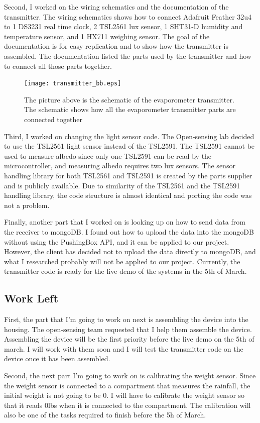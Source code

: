 \documentclass[onecolumn, draftclsnofoot,10pt, compsoc]{IEEEtran}
\begin{document}
Second, I worked on the wiring schematics and the documentation of the transmitter. The wiring schematics shows how to connect Adafruit Feather 32u4 to 1 DS3231 real time clock, 2 TSL2561 lux sensor, 1 SHT31-D humidity and temperature sensor, and 1 HX711 weighing sensor. The goal of the documentation is for easy replication and to show how the transmitter is assembled. The documentation listed the parts used by the transmitter and how to connect all those parts together.

\begin{figure}[ht]
\caption{The picture above is the schematic of the evaporometer transmitter. The schematic shows how all the evaporometer transmitter parts are connected together}
\centering
\texttt{[image: transmitter\_bb.eps]}
\end{figure}

Third, I worked on changing the light sensor code. The Open-sensing lab decided to use the TSL2561 light sensor instead of the TSL2591. The TSL2591 cannot be used to measure albedo since only one TSL2591 can be read by the microcontroller, and measuring albedo requires two lux sensors. The sensor handling library for both TSL2561 and TSL2591 is created by the parts supplier and is publicly available. Due to similarity of the TSL2561 and the TSL2591 handling library, the code structure is almost identical and porting the code was not a problem. 


Finally, another part that I worked on is looking up on how to send data from the receiver to mongoDB. I found out how to upload the data into the mongoDB without using the PushingBox API, and it can be applied to our project. However, the client has decided not to upload the data directly to mongoDB, and what I researched probably will not be applied to our project.
Currently, the transmitter code is ready for the live demo of the systems in the 5th of March. 

\subsection{Work Left}
First, the part that I’m going to work on next is assembling the device into the housing. The open-sensing team requested that I help them assemble the device. Assembling the device will be the first priority before the live demo on the 5th of march. I will work with them soon and I will test the transmitter code on the device once it has been assembled.


Second, the next part I’m going to work on is calibrating the weight sensor. Since the weight sensor is connected to a compartment that measures the rainfall, the initial weight is not going to be 0. I will have to calibrate the weight sensor so that it reads 0lbs when it is connected to the compartment. The calibration will also be one of the tasks required to finish before the 5h of March.
\end{document}
